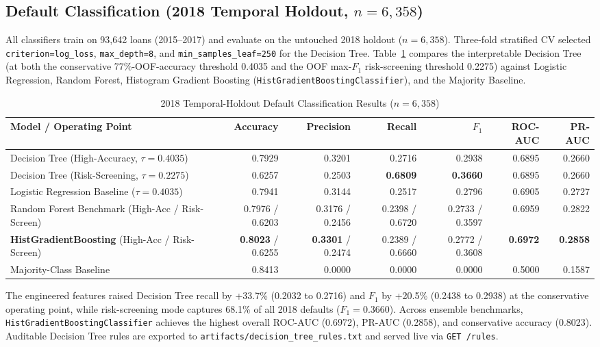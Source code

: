 \documentclass[conference]{IEEEtran}
\begin{document}
\subsection{Default Classification (2018 Temporal Holdout, $n=6{,}358$)}
All classifiers \cite{hastie,scikitlearn} train on 93,642 loans (2015--2017) and evaluate on the untouched 2018 holdout ($n=6{,}358$). Three-fold stratified CV selected \texttt{criterion=log\_loss}, \texttt{max\_depth=8}, and \texttt{min\_samples\_leaf=250} for the Decision Tree. Table~\ref{tab:classification_results} compares the interpretable Decision Tree (at both the conservative 77\%-OOF-accuracy threshold 0.4035 and the OOF max-$F_1$ risk-screening threshold 0.2275) against Logistic Regression, Random Forest, Histogram Gradient Boosting (\texttt{HistGradientBoostingClassifier}), and the Majority Baseline.
\begin{table}[!t]
\caption{2018 Temporal-Holdout Default Classification Results ($n=6{,}358$)}
\label{tab:classification_results}
\centering
\footnotesize
\begin{tabularx}{\textwidth}{@{}X r r r r r r@{}}
\toprule
\textbf{Model / Operating Point} & \textbf{Accuracy} & \textbf{Precision} & \textbf{Recall} & \textbf{$F_1$} & \textbf{ROC-AUC} & \textbf{PR-AUC}\\
\midrule
Decision Tree (High-Accuracy, $\tau=0.4035$) & 0.7929 & 0.3201 & 0.2716 & 0.2938 & 0.6895 & 0.2660\\
Decision Tree (Risk-Screening, $\tau=0.2275$) & 0.6257 & 0.2503 & \textbf{0.6809} & \textbf{0.3660} & 0.6895 & 0.2660\\
Logistic Regression Baseline ($\tau=0.4035$) & 0.7941 & 0.3144 & 0.2517 & 0.2796 & 0.6905 & 0.2727\\
Random Forest Benchmark (High-Acc / Risk-Screen) & 0.7976 / 0.6203 & 0.3176 / 0.2456 & 0.2398 / 0.6720 & 0.2733 / 0.3597 & 0.6959 & 0.2822\\
\textbf{HistGradientBoosting} (High-Acc / Risk-Screen) & \textbf{0.8023} / 0.6255 & \textbf{0.3301} / 0.2474 & 0.2389 / 0.6660 & 0.2772 / 0.3608 & \textbf{0.6972} & \textbf{0.2858}\\
Majority-Class Baseline & 0.8413 & 0.0000 & 0.0000 & 0.0000 & 0.5000 & 0.1587\\
\bottomrule
\end{tabularx}
\end{table}

The engineered features raised Decision Tree recall by +33.7\% (0.2032 to 0.2716) and $F_1$ by +20.5\% (0.2438 to 0.2938) at the conservative operating point, while risk-screening mode captures 68.1\% of all 2018 defaults ($F_1=0.3660$). Across ensemble benchmarks, \texttt{HistGradientBoostingClassifier} achieves the highest overall ROC-AUC (0.6972), PR-AUC (0.2858), and conservative accuracy (0.8023). Auditable Decision Tree rules are exported to \texttt{artifacts/decision\_tree\_rules.txt} and served live via \texttt{GET /rules}.
\end{document}
